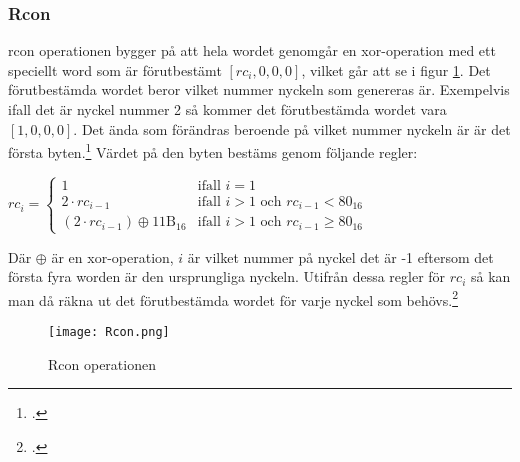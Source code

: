 \subsubsection{Rcon}
\label{sec:aes-rcon}

\acrshort{rcon} operationen bygger på att hela wordet genomgår en \gls{xor}-operation med ett speciellt word som är förutbestämt $[rc_i, 0, 0, 0]$, vilket går att se i figur \ref{fig:aes-rcon-pic}.
Det förutbestämda wordet beror vilket nummer nyckeln som genereras är.
Exempelvis ifall det är nyckel nummer 2 så kommer det förutbestämda wordet vara $[1, 0, 0, 0]$. Det ända som förändras beroende på vilket nummer nyckeln är är det första \gls{byte}n.\footcite{daemen1999aes}
Värdet på den \gls{byte}n bestäms genom följande regler:

\begin{center}
    \begin{math}
        rc_i =
        \begin{cases}
            1 & \text{ifall } i = 1 \\
            2 \cdot rc_{i-1} & \text{ifall } i > 1 \text{ och } rc_{i-1} < 80_{16} \\
            (2 \cdot rc_{i-1}) \oplus \text {11B}_{16} & \text{ifall } i > 1 \text{ och } rc_{i-1} \ge 80_{16}
        \end{cases}
    \end{math}
\end{center}

Där $\oplus$ är en \gls{xor}-operation, $i$ är vilket nummer på nyckel det är -1 eftersom det första fyra worden är den ursprungliga nyckeln.
Utifrån dessa regler för $rc_i$ så kan man då räkna ut det förutbestämda wordet för varje nyckel som behövs.\footcite{daemen1999aes}

\begin{figure}[H]
    \centering
    \texttt{[image: Rcon.png]}
    \caption{Rcon operationen}
    \label{fig:aes-rcon-pic}
\end{figure}
